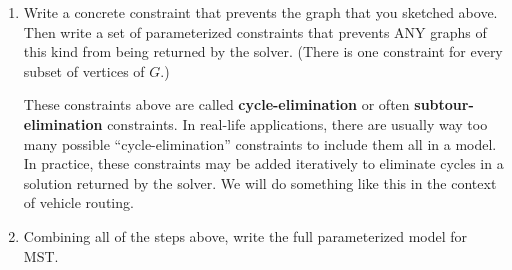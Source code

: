 \documentclass[11pt]{article}
\theoremstyle{definition}
\begin{document}
\begin{enumerate}[resume]
\vfill
\item Write a concrete constraint that prevents the graph that you sketched above.  Then write a set of parameterized constraints that prevents ANY graphs of this kind from being returned by the solver.  (There is one constraint for every subset of vertices of $G$.)

\vfill






\begin{tcolorbox}
These constraints above are called \textbf{cycle-elimination} or often \textbf{subtour-elimination} constraints.  In real-life applications, there are usually way too many possible ``cycle-elimination'' constraints to include them all in a model.  In practice, these constraints may be added iteratively to eliminate cycles in a solution returned by the solver.  We will do something like this in the context of vehicle routing.
\end{tcolorbox}

\newpage
\item Combining all of the steps above, write the full parameterized model for MST.
\end{enumerate}
\end{document}
